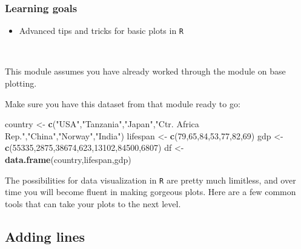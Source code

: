 \documentclass[
]{book}
\newenvironment{Shaded}{\begin{snugshade}}{\end{snugshade}}
\newcommand{\DecValTok}[1]{\textcolor[rgb]{0.00,0.00,0.81}{#1}}
\newcommand{\KeywordTok}[1]{\textcolor[rgb]{0.13,0.29,0.53}{\textbf{#1}}}
\newcommand{\NormalTok}[1]{#1}
\newcommand{\StringTok}[1]{\textcolor[rgb]{0.31,0.60,0.02}{#1}}
\providecommand{\tightlist}{%
  \setlength{\itemsep}{0pt}\setlength{\parskip}{0pt}}
\begin{document}
\hypertarget{learning-goals-27}{%
\subsubsection*{Learning goals}\label{learning-goals-27}}

\begin{itemize}
\tightlist
\item
  Advanced tips and tricks for basic plots in \texttt{R}
\end{itemize}

~

This module assumes you have already worked through the module on base plotting.

Make sure you have this dataset from that module ready to go:

\begin{Shaded}
\begin{Highlighting}[]
\NormalTok{country <-}\StringTok{ }\KeywordTok{c}\NormalTok{(}\StringTok{"USA"}\NormalTok{,}\StringTok{"Tanzania"}\NormalTok{,}\StringTok{"Japan"}\NormalTok{,}\StringTok{"Ctr. Africa Rep."}\NormalTok{,}\StringTok{"China"}\NormalTok{,}\StringTok{"Norway"}\NormalTok{,}\StringTok{"India"}\NormalTok{)}
\NormalTok{lifespan <-}\StringTok{ }\KeywordTok{c}\NormalTok{(}\DecValTok{79}\NormalTok{,}\DecValTok{65}\NormalTok{,}\DecValTok{84}\NormalTok{,}\DecValTok{53}\NormalTok{,}\DecValTok{77}\NormalTok{,}\DecValTok{82}\NormalTok{,}\DecValTok{69}\NormalTok{)}
\NormalTok{gdp <-}\StringTok{ }\KeywordTok{c}\NormalTok{(}\DecValTok{55335}\NormalTok{,}\DecValTok{2875}\NormalTok{,}\DecValTok{38674}\NormalTok{,}\DecValTok{623}\NormalTok{,}\DecValTok{13102}\NormalTok{,}\DecValTok{84500}\NormalTok{,}\DecValTok{6807}\NormalTok{)}
\NormalTok{df <-}\StringTok{ }\KeywordTok{data.frame}\NormalTok{(country,lifespan,gdp)}
\end{Highlighting}
\end{Shaded}

The possibilities for data visualization in \texttt{R} are pretty much limitless, and over time you will become fluent in making gorgeous plots. Here are a few common tools that can take your plots to the next level.

\hypertarget{adding-lines}{%
\subsection*{Adding lines}\label{adding-lines}}
\end{document}
